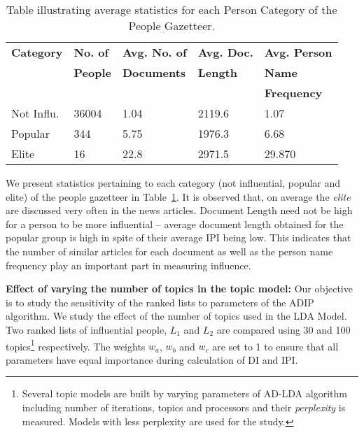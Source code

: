 
\begin{table}[t!]
\caption {Table illustrating average statistics for each Person Category of the People Gazetteer.}
\label{table:stats}
\resizebox{8cm}{!} {
\centering

    \begin{tabular}{|lllll|}
    \hline
    \textbf{Category}  &  \textbf{No. of }   & \textbf{Avg. No. of }   &  \textbf{Avg. Doc. }	&  \textbf{Avg. Person }	\\  
    & \textbf{People} & \textbf{Documents} & \textbf{Length} &  \textbf{Name } \\
    & & & & \textbf{Frequency} \\  \hline
Not Influ. & 36004 & 1.04 & 2119.6 & 1.07 	\\ \hline
 Popular & 344 & 5.75 & 1976.3 & 6.68  \\ \hline
Elite & 16 & 22.8 & 2971.5 & 29.870	 \\	\hline 
  \end{tabular}}
\end{table}

We present statistics pertaining to each category (not influential, popular and elite) of the people gazetteer in Table~\ref{table:stats}. 
It is observed that, on average the \emph{elite} are discussed very often in the news articles.
Document Length need not be high for a person to be more influential -- average document length obtained for the popular group is high in spite of their average IPI being low. This indicates that the number of similar articles for each document as well as the person name frequency play an important part in measuring influence.

\noindent \textbf{Effect of varying the number of topics in the topic model: } Our objective is to study the sensitivity of the ranked lists to parameters of the ADIP algorithm. We study the effect of the number of topics used in the LDA Model.  
Two ranked lists of influential people, $L_1$ and $L_2$ are compared using 30 and 100 topics\footnote{Several topic models are built by varying parameters of AD-LDA algorithm including number of iterations, topics and processors and their \emph{perplexity} is measured. Models with less perplexity are used for the study.} respectively. The weights $w_a$, $w_b$ and $w_c$ are set to 1 to ensure that all parameters have equal importance during calculation of DI and IPI. 

